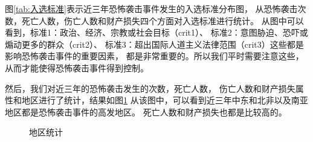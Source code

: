 \documentclass[bwprint]{gmcmthesis}
\begin{document}
图\ref{tab:入选标准}表示近三年恐怖袭击事件发生的入选标准分布图，
从恐怖袭击次数，死亡人数，伤亡人数和财产损失四个方面对入选标准进行统计。
从图中可以看到，标准1：政治、经济、宗教或社会目标（crit1）、
标准2：意图胁迫、恐吓或煽动更多的群众（crit2）、
标准3：超出国际人道主义法律范围（crit3）这些都是影响恐怖袭击事件的重要因素，
都是非常重要的。所以我们平时需要注意这些，从而才能使得恐怖袭击事件得到控制。

然后，我们对近三年的恐怖袭击发生的次数，死亡人数，
伤亡人数和财产损失属性和地区进行了统计，结果如图\ref{tab:地区统计}
从该图中，可以看到近三年中东和北非以及南亚地区都是恐怖袭击事件的高发地区。
死亡人数和财产损失也都是比较高的。
\begin{figure}[htbp]
    \caption{地区统计}
    \label{tab:地区统计}
\end{figure}
\end{document}
